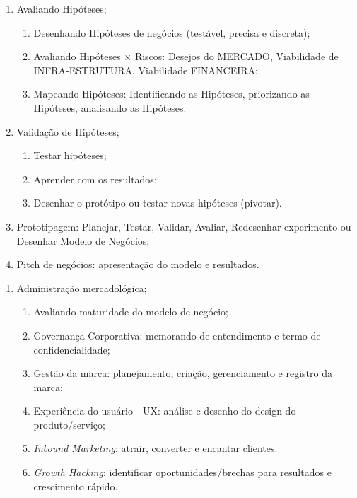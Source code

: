 \begin{pud}
\begin{description}[itemsep=0em, topsep=0em]
\begin{enumerate}[itemsep=0em, topsep=0em, label*=\arabic*.]
			\item Avaliando Hipóteses;
			\begin{enumerate}[itemsep=0em, topsep=0em, label*=\arabic*.]
				\item Desenhando Hipóteses de negócios (testável, precisa e discreta);
				\item Avaliando Hipóteses $\times$ Riscos: Desejos do MERCADO, Viabilidade de INFRA-ESTRUTURA, Viabilidade FINANCEIRA;
				\item Mapeando Hipóteses: Identificando as Hipóteses, priorizando as Hipóteses, analisando as Hipóteses. 
			\end{enumerate}
			
			\item Validação de Hipóteses;
			\begin{enumerate}[itemsep=0em, topsep=0em, label*=\arabic*.]
				\item Testar hipóteses;
				\item Aprender com os resultados;
            	\item Desenhar o protótipo ou testar novas hipóteses (pivotar). 
			\end{enumerate}
			
			\item Prototipagem: Planejar, Testar, Validar, Avaliar, Redesenhar experimento ou Desenhar Modelo de Negócios;
			\item Pitch de negócios: apresentação do modelo e resultados.

		\end{enumerate}
		
	    \item[UNIDADE II:] \quad
		\begin{enumerate}[itemsep=0em, topsep=0em]
			\item Administração mercadológica;
			\begin{enumerate}[itemsep=0em, topsep=0em, label*=\arabic*.]
				\item Avaliando maturidade do modelo de negócio;
				\item Governança Corporativa: memorando de entendimento e termo de confidencialidade;
				\item Gestão da marca: planejamento, criação, gerenciamento e registro da marca;
				\item Experiência do usuário - UX: análise e desenho do design do produto/serviço;
				\item \textit{Inbound Marketing}: atrair, converter e encantar clientes.
				\item \textit{Growth Hacking}: identificar oportunidades/brechas para resultados e crescimento rápido. 
			\end{enumerate}
			

\end{enumerate}
\end{description}
\end{pud}
